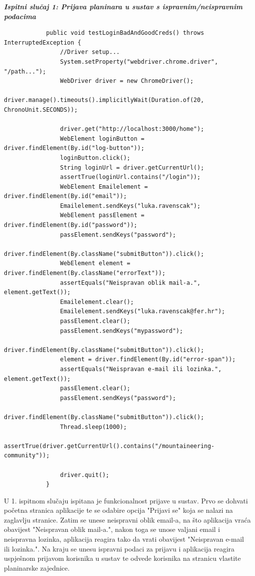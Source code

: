 		
		 	\textbf{\textit{Ispitni slučaj 1: Prijava planinara u sustav s ispravnim/neispravnim podacima}}
		 	
		 	\begin{lstlisting}
		 	public void testLoginBadAndGoodCreds() throws InterruptedException {
		 		//Driver setup...
		 		System.setProperty("webdriver.chrome.driver", "/path...");
		 		WebDriver driver = new ChromeDriver(); 
		 		driver.manage().timeouts().implicitlyWait(Duration.of(20, ChronoUnit.SECONDS));
		 		
		 		driver.get("http://localhost:3000/home");
		 		WebElement loginButton = driver.findElement(By.id("log-button"));
		 		loginButton.click();
		 		String loginUrl = driver.getCurrentUrl();
		 		assertTrue(loginUrl.contains("/login"));
		 		WebElement Emailelement = driver.findElement(By.id("email"));        
		 		Emailelement.sendKeys("luka.ravenscak");   
		 		WebElement passElement = driver.findElement(By.id("password"));
		 		passElement.sendKeys("password");
		 		driver.findElement(By.className("submitButton")).click();
		 		WebElement element = driver.findElement(By.className("errorText"));
		 		assertEquals("Neispravan oblik mail-a.", element.getText());
		 		Emailelement.clear();
		 		Emailelement.sendKeys("luka.ravenscak@fer.hr");
		 		passElement.clear();
		 		passElement.sendKeys("mypassword");
		 		driver.findElement(By.className("submitButton")).click();
		 		element = driver.findElement(By.id("error-span"));
		 		assertEquals("Neispravan e-mail ili lozinka.", element.getText());
		 		passElement.clear();
		 		passElement.sendKeys("password");
		 		driver.findElement(By.className("submitButton")).click();
		 		Thread.sleep(1000);
		 		assertTrue(driver.getCurrentUrl().contains("/mountaineering-community"));
		 		
		 		driver.quit();
		 	}
		 	\end{lstlisting}
	 	
	 	 U 1. ispitnom slučaju ispitana je funkcionalnost prijave u sustav. Prvo se dohvati početna stranica aplikacije te se odabire opcija "Prijavi se" koja se nalazi na zaglavlju stranice. Zatim se unese neispravni oblik email-a, na što aplikacija vraća obavijest "Neispravan oblik mail-a.", nakon toga se unose valjani email i neispravna lozinka, aplikacija reagira tako da vrati obavijest "Neispravan e-mail ili lozinka.". Na kraju se unesu ispravni podaci za prijavu i aplikacija reagira uspješnom prijavom korisnika u sustav te odvede korisnika na stranicu vlastite planinarske zajednice.\newline
	 	 
